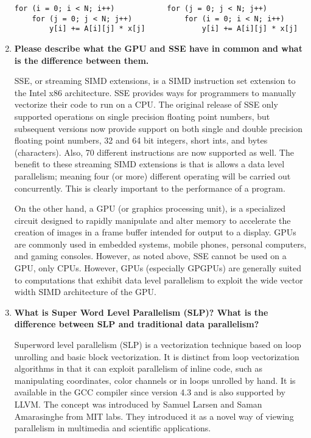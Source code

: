 \documentclass[10pt]{article} %
\begin{document}
\begin{enumerate}
\begin{verbatim}
for (i = 0; i < N; i++)            for (j = 0; j < N; j++)
    for (j = 0; j < N; j++)            for (i = 0; i < N; i++)
        y[i] += A[i][j] * x[j]             y[i] += A[i][j] * x[j]
\end{verbatim}

\item %
\textbf{Please describe what the GPU and SSE have in common and what is the difference between them.  }

SSE, or streaming SIMD extensions, is a SIMD instruction set extension to the Intel x86 architecture.  SSE provides ways for programmers to manually vectorize their code to run on a CPU.  The original release of SSE only supported operations on single precision floating point numbers, but subsequent versions now provide support on both single and double precision floating point numbers, 32 and 64 bit integers, short ints, and bytes (characters).  Also, 70 different instructions are now supported as well.  The benefit to these streaming SIMD extensions is that is allows a data level parallelism; meaning four (or more) different operating will be carried out concurrently.  This is clearly important to the performance of a program.  

On the other hand, a GPU (or graphics processing unit), is a specialized circuit designed to rapidly manipulate and alter memory to accelerate the creation of images in a frame buffer intended for output to a display.  GPUs are commonly used in embedded systems, mobile phones, personal computers, and gaming consoles.  However, as noted above, SSE cannot be used on a GPU, only CPUs.  However, GPUs (especially GPGPUs) are generally suited to computations that exhibit data level parallelism to exploit the wide vector width SIMD architecture of the GPU.  

\item %
\textbf{What is Super Word Level Parallelism (SLP)?  What is the difference between SLP and traditional data parallelism?  }

Superword level parallelism (SLP) is a vectorization technique based on loop unrolling and basic block vectorization.  It is distinct from loop vectorization algorithms in that it can exploit parallelism of inline code, such as manipulating coordinates, color channels or in loops unrolled by hand.  It is available in the GCC compiler since version 4.3 and is also supported by LLVM.  The concept was introduced by Samuel Larsen and Saman Amarasinghe from MIT labs.  They introduced it as a novel way of viewing parallelism in multimedia and scientific applications.  


\end{enumerate}
\end{document}
